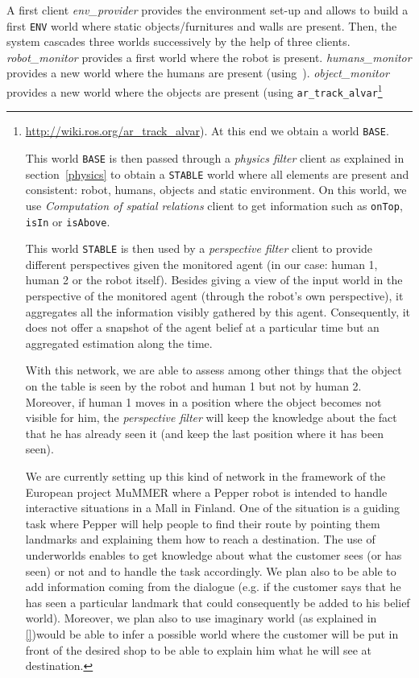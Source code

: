 \documentclass[letterpaper, 10pt, conference]{ieeeconf}
\newcommand{\uwds}{{\sc underworlds}\xspace}
\begin{document}
A first client \textit{env\_provider} provides the environment set-up and allows to build a first \texttt{ENV} world where static objects/furnitures and walls are present. 
Then, the system cascades three worlds successively by the help of three clients. \textit{robot\_monitor} provides a first world where the robot is present. \textit{humans\_monitor} provides a new world where the humans are present (using~\cite{Khalidov_Idiap-RR-02-2017}). \textit{object\_monitor} provides a new world where the objects are present (using {\tt ar\_track\_alvar}\footnote{\url{http://wiki.ros.org/ar\_track\_alvar}). At this end we obtain a world \texttt{BASE}.

This world \texttt{BASE} is then passed through a \textit{physics filter} client as explained in section~\ref{physics} to obtain a \texttt{STABLE} world where all elements are present and consistent: robot, humans, objects and static environment. On this world, we use \textit{Computation of spatial relations} client to get information such as {\tt onTop}, {\tt isIn} or {\tt isAbove}.

This world \texttt{STABLE} is then used by a \textit{perspective filter} client to provide different perspectives given the monitored agent (in our case: human 1, human 2 or the robot itself). Besides giving a view of the input world in the perspective of the monitored agent (through the robot's own perspective), it aggregates all the information visibly gathered by this agent. Consequently, it does not offer a snapshot of the agent belief at a particular time but an aggregated estimation along the time.

With this network, we are able to assess among other things that the object on the table is seen by the robot and human 1 but not by human 2. Moreover, if human 1 moves in a position where the object becomes not visible for him, the \textit{perspective filter} will keep the knowledge about the fact that he has already seen it (and keep the last position where it has been seen).


We are currently setting up this kind of network in the framework of the European project MuMMER where a Pepper robot is intended to handle interactive situations in a Mall in Finland. One of the situation is a guiding task where Pepper will help people to find their route by pointing them landmarks and explaining them how to reach a destination. The use of \uwds enables to get knowledge about what the customer sees (or has seen) or not and to handle the task accordingly. We plan also to be able to add information coming from the dialogue (e.g. if the customer says that he has seen a particular landmark that could consequently be added to his belief world). Moreover, we plan also to use imaginary world (as explained in \ref{})would be able to infer a possible world where the customer will be put in front of the desired shop to be able to explain him what he will see at destination.

}
\end{document}
